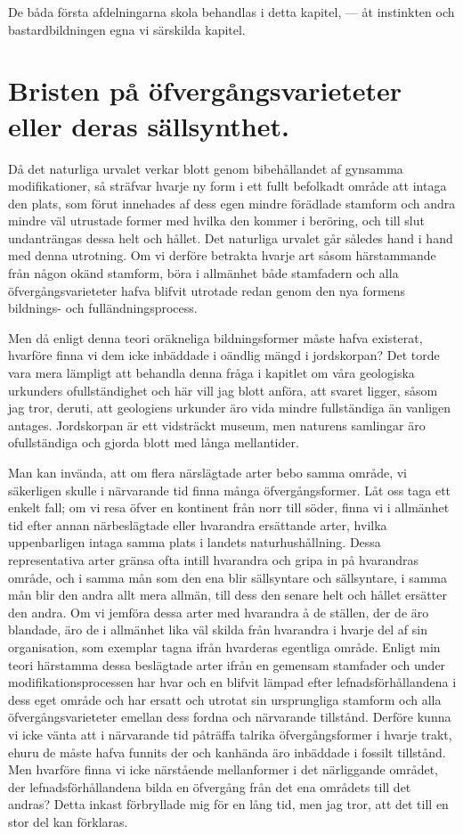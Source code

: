 De båda första afdelningarna skola behandlas i detta kapitel, — åt instinkten och bastardbildningen egna vi särskilda kapitel.



\section[Bristen på öfvergångsvarieteter]{Bristen på öfvergångsvarieteter eller deras
sällsynthet.}

Då det naturliga urvalet verkar blott genom bibehållandet af gynsamma modifikationer, så sträfvar hvarje ny form i ett fullt befolkadt område att intaga den plats, som förut innehades af dess egen mindre förädlade stamform och andra mindre väl utrustade former med hvilka den kommer i beröring, och till slut undanträngas dessa helt och hållet. Det naturliga urvalet går således hand i hand med denna utrotning. Om vi derföre betrakta hvarje art såsom härstammande från någon okänd stamform, böra i allmänhet både stamfadern och alla öfvergångsvarieteter hafva blifvit utrotade redan genom den nya formens bildnings- och fulländningsprocess.

Men då enligt denna teori oräkneliga bildningsformer måste hafva existerat, hvarföre finna vi dem icke inbäddade i oändlig mängd i jordskorpan? Det torde vara mera lämpligt att behandla denna fråga i kapitlet om våra geologiska urkunders ofullständighet och här vill jag blott anföra, att svaret ligger, såsom jag tror, deruti, att geologiens urkunder äro vida mindre fullständiga än vanligen antages. Jordskorpan är ett vidsträckt museum, men naturens samlingar äro ofullständiga och gjorda blott med långa mellantider.

Man kan invända, att om flera närslägtade arter bebo samma område, vi säkerligen skulle i närvarande tid finna många öfvergångsformer. Låt oss taga ett enkelt fall; om vi resa öfver en kontinent från norr till söder, finna vi i allmänhet tid efter annan närbeslägtade eller hvarandra ersättande arter, hvilka uppenbarligen intaga samma plats i landets naturhushållning. Dessa representativa arter gränsa ofta intill hvarandra och gripa in på hvarandras område, och i samma mån som den ena blir sällsyntare och sällsyntare, i samma mån blir den andra allt mera allmän, till dess den senare helt och hållet ersätter den andra. Om vi jemföra dessa arter med hvarandra å de ställen, der de äro blandade, äro de i allmänhet lika väl skilda från hvarandra i hvarje del af sin organisation, som exemplar tagna ifrån hvarderas egentliga område. Enligt min teori härstamma dessa beslägtade arter ifrån en gemensam stamfader och under modifikationsprocessen har hvar och en blifvit lämpad efter lefnadsförhållandena i dess eget område och har ersatt och utrotat sin ursprungliga stamform och alla öfvergångsvarieteter emellan dess fordna och närvarande tillstånd. Derföre kunna vi icke vänta att i närvarande tid påträffa talrika öfvergångsformer i hvarje trakt, ehuru de måste hafva funnits der och kanhända äro inbäddade i fossilt tillstånd. Men hvarföre finna vi icke närstående mellanformer i det närliggande området, der lefnadsförhållandena bilda en öfvergång från det ena områdets till det andras? Detta inkast förbryllade mig för en lång tid, men jag tror, att det till en stor del kan förklaras.

